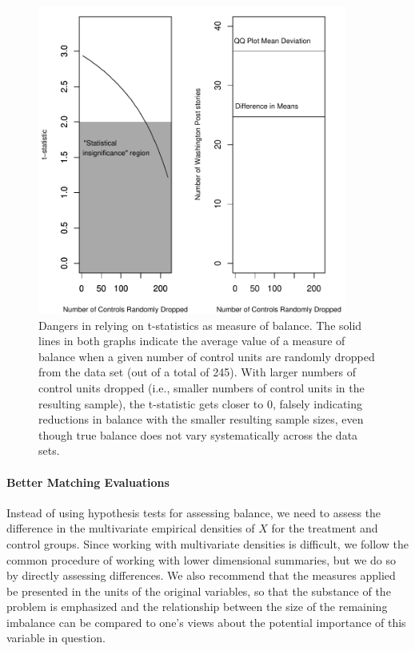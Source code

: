 \documentclass[11pt,titlepage]{article}
\begin{document}
\begin{figure}[t] 
 \begin{center}
   \includegraphics[height=4in]{figs/TStatPlote.pdf}
  \end{center}
  \vspace{-0.275in}
  \caption{Dangers in relying on t-statistics as measure of balance.
    The solid lines in both graphs indicate the average value of a
    measure of balance when a given number of control units are
    randomly dropped from the data set (out of a total of 245).  With
    larger numbers of control units dropped (i.e., smaller numbers of
    control units in the resulting sample), the t-statistic gets
    closer to 0, falsely indicating reductions in balance with the
    smaller resulting sample sizes, even though true balance does not
    vary systematically across the data sets.}
  \label{f:tstat}
\end{figure}

\paragraph{Better Matching Evaluations}

Instead of using hypothesis tests for assessing balance, we need to
assess the difference in the multivariate empirical densities of $X$
for the treatment and control groups.  Since working with multivariate
densities is difficult, we follow the common procedure of working with
lower dimensional summaries, but we do so by directly assessing
differences.  We also recommend that the measures applied be presented
in the units of the original variables, so that the substance of the
problem is emphasized and the relationship between the size of the
remaining imbalance can be compared to one's views about the potential
importance of this variable in question.
\end{document}
